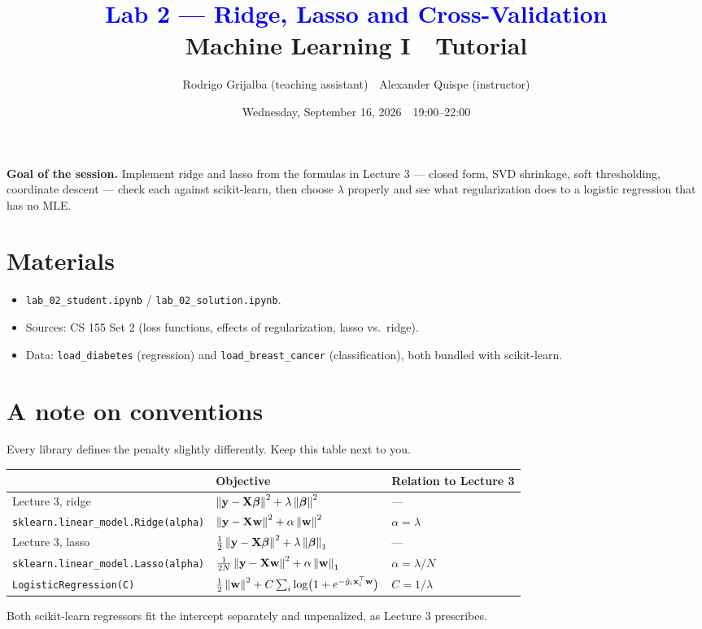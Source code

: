 \documentclass[11pt]{article}
\title{\textcolor{blue}{Lab 2 --- Ridge, Lasso and Cross-Validation}\\[4pt]
\large Machine Learning I \,\textperiodcentered\, Tutorial}
\author{Rodrigo Grijalba (teaching assistant) \,\textperiodcentered\, Alexander Quispe (instructor)}
\date{Wednesday, September 16, 2026 \,\textperiodcentered\, 19:00--22:00}
\begin{document}
\maketitle

\begin{keypoint}
\textbf{Goal of the session.} Implement ridge and lasso from the formulas in Lecture 3 --- closed form,
SVD shrinkage, soft thresholding, coordinate descent --- check each against scikit-learn, then choose
$\lambda$ properly and see what regularization does to a logistic regression that has no MLE.
\end{keypoint}

\section*{Materials}
\begin{itemize}[nosep]
  \item \texttt{lab\_02\_student.ipynb} / \texttt{lab\_02\_solution.ipynb}.
  \item Sources: CS 155 Set 2 (loss functions, effects of regularization, lasso vs.\ ridge).
  \item Data: \texttt{load\_diabetes} (regression) and \texttt{load\_breast\_cancer} (classification), both bundled with scikit-learn.
\end{itemize}

\section*{A note on conventions}
Every library defines the penalty slightly differently. Keep this table next to you.
\begin{center}\small
\begin{tabular}{lll}
\toprule
 & Objective & Relation to Lecture 3 \\
\midrule
Lecture 3, ridge & $\left\lVert \mathbf{y}-\mathbf{X}\boldsymbol{\beta} \right\rVert^2+\lambda\left\lVert \boldsymbol{\beta} \right\rVert^2$ & --- \\
\texttt{sklearn.linear\_model.Ridge(alpha)} & $\left\lVert \mathbf{y}-\mathbf{X}\mathbf{w} \right\rVert^2+\alpha\left\lVert \mathbf{w} \right\rVert^2$ & $\alpha=\lambda$ \\
Lecture 3, lasso & $\frac12\left\lVert \mathbf{y}-\mathbf{X}\boldsymbol{\beta} \right\rVert^2+\lambda\left\lVert \boldsymbol{\beta} \right\rVert_1$ & --- \\
\texttt{sklearn.linear\_model.Lasso(alpha)} & $\frac{1}{2N}\left\lVert \mathbf{y}-\mathbf{X}\mathbf{w} \right\rVert^2+\alpha\left\lVert \mathbf{w} \right\rVert_1$ & $\alpha=\lambda/N$ \\
\texttt{LogisticRegression(C)} & $\frac12\left\lVert \mathbf{w} \right\rVert^2+C\sum_i\log\bigl(1+e^{-\tilde y_i\mathbf{x}_i^{\top}\mathbf{w}}\bigr)$ & $C=1/\lambda$ \\
\bottomrule
\end{tabular}
\end{center}
Both scikit-learn regressors fit the intercept separately and unpenalized, as Lecture 3 prescribes.
\end{document}
